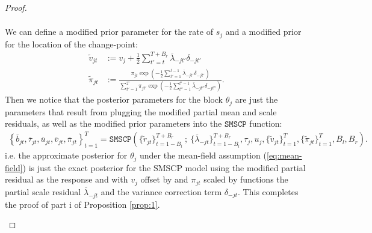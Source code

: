 \begin{proof}
\begin{enumerate}[label=\roman*.]
\begin{align*}
\end{align*}
We can define a modified prior parameter for the rate of $s_{j}$ and a modified prior for the location of the change-point:
\begin{align*}
    \tilde{v}_{jt} &:= v_j + \frac{1}{2}\sum_{t'=t}^{T+B_r}\overline{\lambda}_{-jt'}\delta_{-jt'}  \\
    \tilde{\pi}_{jt} &:= \frac{\pi_{jt} \exp\left(-\frac{1}{2}\sum_{t'=1}^{t-1}\overline{\lambda}_{-jt'}\delta_{-jt'}\right)}{\sum_{t'=1}^T \pi_{jt'} \exp\left(-\frac{1}{2}\sum_{t''=1}^{t'-1}\overline{\lambda}_{-jt''}\delta_{-jt''}\right)}.
\end{align*}
Then we notice that the posterior parameters for the block $\theta_j$ are just the parameters that result from plugging the modified partial mean and scale residuals, as well as the modified prior parameters into the $\texttt{SMSCP}$ function:
\small
\begin{align*}
    \left\{\overline{b}_{jt}, \overline{\tau}_{jt}, \overline{u}_{jt}, \overline{v}_{jt}, \overline{\pi}_{jt}\right\}_{t=1}^T = \texttt{SMSCP}\left(\{\tilde{r}_{jt}\}_{t=1-B_l}^{T+B_r} \:;\:\{\overline{\lambda}_{-jt}\}_{t=1-B_l}^{T+B_r}, \tau_j, u_j, \{\tilde{v}_{jt}\}_{t=1}^T, \{\tilde{\pi}_{jt}\}_{t=1}^T, B_l,B_r\right).
\end{align*}
\normalsize
i.e. the approximate posterior for $\theta_j$ under the mean-field assumption (\ref{eq:mean-field}) is just the exact posterior for the SMSCP model using the modified partial residual as the response and with $v_j$ offset by and $\pi_{jt}$ scaled by functions the partial scale residual $\overline{\lambda}_{-jt}$ and the variance correction term $\delta_{-jt}$. This completes the proof of part i of Proposition \ref{prop:1}.


\end{enumerate}
\end{proof}
